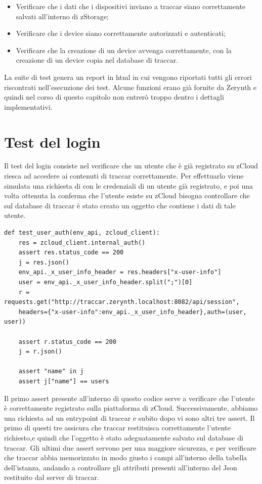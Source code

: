 \documentclass[a4paper,titlepage,12pt]{book}
\begin{document}
{\begin{itemize}
\item Verificare che i dati che i dispositivi inviano a traccar siano correttamente salvati all'interno di zStorage;

\item Verificare che i device siano correttamente autorizzati e autenticati;

\item Verificare che la creazione di un device avvenga correttamente, con la creazione di un device copia nel database di traccar.
\end{itemize}

La suite di test genera un report in html in cui vengono riportati tutti gli errori riscontrati nell'esecuzione dei test. Alcune funzioni erano già fornite da Zerynth e quindi nel corso di questo capitolo non entrerò troppo dentro i dettagli implementativi.

\section{
Test del login}
Il test del login consiste nel verificare che un utente che è già registrato su zCloud riesca ad accedere ai contenuti di traccar correttamente. Per effettuarlo viene simulata una richiesta di con le credenziali di un utente già registrato, e poi una volta ottenuta la conferma che l'utente esiste su zCloud bisogna controllare che sul database di traccar è stato creato un oggetto che contiene i dati di tale utente.

\begin{verbatim}
def test_user_auth(env_api, zcloud_client):
    res = zcloud_client.internal_auth()
    assert res.status_code == 200
    j = res.json()
    env_api._x_user_info_header = res.headers["x-user-info"]
    user = env_api._x_user_info_header.split(";")[0]
    r = requests.get("http://traccar.zerynth.localhost:8082/api/session", 
    headers={"x-user-info":env_api._x_user_info_header},auth=(user, user))
    
    assert r.status_code == 200
    j = r.json()

    assert "name" in j
    assert j["name"] == users
\end{verbatim}

\noindent Il primo assert presente all'interno di questo codice serve a verificare che l'utente è correttamente registrato sulla piattaforma di zCloud. Successivamente, abbiamo una richiesta ad un entrypoint di traccar e subito dopo vi sono altri tre assert. Il primo di questi tre assicura che traccar restituisca correttamente l'utente richiesto,e quindi che l'oggetto è stato adeguatamente salvato sul database di traccar. Gli ultimi due assert servono per una maggiore sicurezza, e per verificare che traccar abbia memorizzato in modo giusto i campi all'interno della tabella dell'istanza, andando a controllare gli attributi presenti all'interno del Json restituito dal server di traccar.


}
\end{document}

